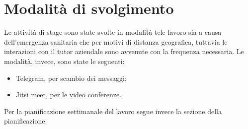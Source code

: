\section{Modalità di svolgimento}\label{sec:modalita-di-svolgimento}
Le attività di stage sono state svolte in modalità tele-lavoro sia a causa dell'emergenza sanitaria che per motivi di distanza geografica, tuttavia le interazioni con il tutor aziendale sono avvenute con la frequenza necessaria.
Le modalità, invece, sono state le seguenti:
\begin{itemize}
    \item Telegram, per scambio dei messaggi;
    \item Jitsi meet, per le video conferenze.
\end{itemize}
Per la pianificazione settimanale del lavoro segue invece la sezione della pianificazione.